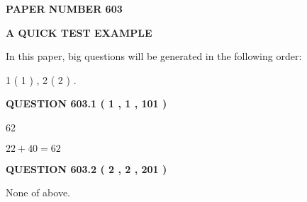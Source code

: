 \documentclass[12pt]{article}
\begin{document}
   
   
   
\newpage 
\setcounter{page}{ 
   603001 } 
   
   
   
   
 {\textbf{ \Large{ PAPER NUMBER  603  }}}
   
   
\vspace{0.2in}
   
   
   
   
   
   
 \vspace{0.2in}
{\LARGE {\textbf{ A QUICK TEST EXAMPLE}}}
   
   
   
\vspace{0.2in}
   
In this paper, big questions will be generated in the following order: 
   
   
   1 ( 1 )
 ,
   2 ( 2 )
 .
  
\vspace{0.2in}
  
{\textbf{\Large{QUESTION
603.1 
 ( 1 , 1 , 101 )
}}}
  
  
 
 
\noindent{}

62
 
 
 
 
\noindent{}

$ %
22 +  %
40=   %
62$
 
 
  
\vspace{0.2in}
  
{\textbf{\Large{QUESTION
603.2 
 ( 2 , 2 , 201 )
}}}
  
  
 
 
\noindent{}
 
 
 None of above.
 
 
 
 
   
   
 \vspace{0.2in}
 
   
   
   
   
\end{document}
